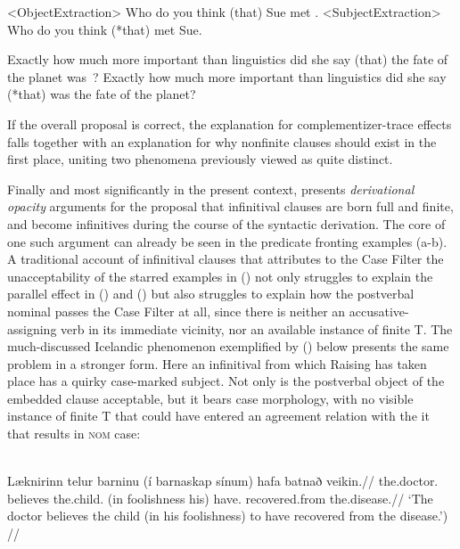 \documentclass[output=paper]{langscibook}
\begin{document}
\noindent {} 
\a<ObjectExtraction> Who do you think (that) Sue met \gap.
\a<SubjectExtraction> Who do you think (*that) \gap met Sue.

\smallskip
\a Exactly how much more important than linguistics did she say (that) the fate of the planet was~\gap? 
\a Exactly how much more important than linguistics did she say (*that) \gap was the fate of the planet? 
\xe

\noindent If the overall proposal is correct, the explanation for complementizer-trace effects falls together with an explanation for why nonfinite clauses should exist in the first place, uniting two phenomena previously viewed as quite distinct.

Finally and most significantly in the present context, \citet{Pesetsky:2019aa} presents \textit{derivational opacity} arguments\textit{ }for the proposal that infinitival clauses are born full and finite, and become infinitives during the course of the syntactic derivation. The core of one such argument can already be seen in the predicate fronting examples (a-b). A traditional account of infinitival clauses that attributes to the Case Filter the unacceptability of the starred examples in () not only struggles to explain the parallel effect in () and () but also struggles to explain how the postverbal nominal passes the Case Filter at all, since there is neither an accusative-assigning verb in its immediate vicinity, nor an available instance of finite T. The much-discussed Icelandic phenomenon exemplified by () below presents the same problem in a stronger form. Here an infinitival from which Raising has taken place has a quirky case-marked subject. Not only is the postverbal object of the embedded clause acceptable, but it bears \Nom{} case morphology, with no visible instance of finite T that could have entered an agreement relation with the it that results in \textsc{nom} case: 

\\
\begingl
\gla Læknirinn telur barninu (í barnaskap sínum) hafa batnað veikin.//
\glb the.doctor.\Nom{} believes the.child.\Dat{} (in foolishness his) have.\Inf{} recovered.from the.disease.\textbf{\Nom{}}//
\glft `The doctor believes the child  (in his foolishness)  to have recovered from the disease.') //
\endgl
\xe
\end{document}
